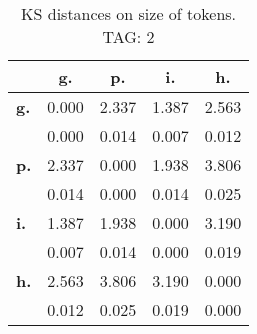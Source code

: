 \begin{table}[h!]
\begin{center}
\begin{tabular}{| l || c | c | c | c |}\hline
 & {\bf g.} & {\bf p.} & {\bf i.} & {\bf h.} \\\hline\hline
{\bf g.} & 0.000 & 2.337 & 1.387 & 2.563 \\
{\bf } & 0.000 & 0.014 & 0.007 & 0.012 \\\hline
{\bf p.} & 2.337 & 0.000 & 1.938 & 3.806 \\
{\bf } & 0.014 & 0.000 & 0.014 & 0.025 \\\hline
{\bf i.} & 1.387 & 1.938 & 0.000 & 3.190 \\
{\bf } & 0.007 & 0.014 & 0.000 & 0.019 \\\hline
{\bf h.} & 2.563 & 3.806 & 3.190 & 0.000 \\
{\bf } & 0.012 & 0.025 & 0.019 & 0.000 \\\hline
\end{tabular}
\caption{KS distances on size of tokens. TAG: 2}
\end{center}
\end{table}
